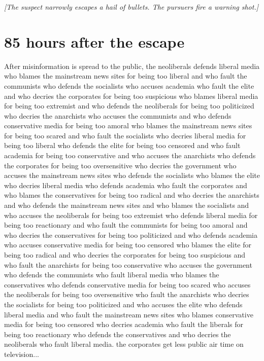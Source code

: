 \documentclass{report}
\begin{document}
\textit{[The suspect narrowly escapes a hail of bullets. The pursuers fire a warning shot.]}


\section*{85 \small{hours after the escape}}

After misinformation is spread to the public, the neoliberals defends liberal media who blames the mainstream news sites for being too liberal and who fault the communists who defends the socialists who accuses academia who fault the elite and who decries the corporates for being too suspicious who blames liberal media for being too extremist and who defends the neoliberals for being too politicized who decries the anarchists who accuses the communists and who defends conservative media for being too amoral who blames the mainstream news sites for being too scared and who fault the socialists who decries liberal media for being too liberal who defends the elite for being too censored and who fault academia for being too conservative and who accuses the anarchists who defends the corporates for being too oversensitive who decries the government who accuses the mainstream news sites who defends the socialists who blames the elite who decries liberal media who defends academia who fault the corporates and who blames the conservatives for being too radical and who decries the anarchists and who defends the mainstream news sites and who blames the socialists and who accuses the neoliberals for being too extremist who defends liberal media for being too reactionary and who fault the communists for being too amoral and who decries the conservatives for being too politicized and who defends academia who accuses conservative media for being too censored who blames the elite for being too radical and who decries the corporates for being too suspicious and who fault the anarchists for being too conservative who accuses the government who defends the communists who fault liberal media who blames the conservatives who defends conservative media for being too scared who accuses the neoliberals for being too oversensitive who fault the anarchists who decries the socialists for being too politicized and who accuses the elite who defends liberal media and who fault the mainstream news sites who blames conservative media for being too censored who decries academia who fault the liberals for being too reactionary who defends the conservatives and who decries the neoliberals who fault liberal media. the corporates get less public air time on television...
\end{document}
